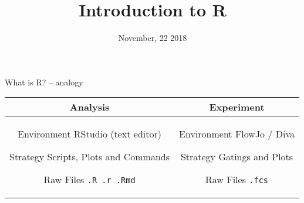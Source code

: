 \documentclass[10pt, xcolor=table]{beamer}
\title{%
  Introduction to R
}
\author{%
}
\date{November, 22 2018}
\institute{%
  \texttt{simon.tournier@univ-paris-diderot.fr}
}
\begin{document}
\begin{frame}
  \titlepage
\end{frame}


\begin{frame}{What is R? -- analogy}

  \begin{tabular}{c|c}
    Analysis & Experiment
    \\
    \hline
    \begin{minipage}{0.49\textwidth}
      \begin{block}{Environment}
        \centering
        RStudio (text editor)
      \end{block}
      \begin{exampleblock}{Strategy}
        \centering
        Scripts, Plots and Commands
      \end{exampleblock}

      \begin{alertblock}{Raw}
        \centering
        Files \texttt{.R .r .Rmd}
      \end{alertblock}
    \end{minipage}
    &
    \begin{minipage}{0.49\textwidth}
      \begin{block}{Environment}
        \centering
        FlowJo / Diva
      \end{block}
      \begin{exampleblock}{Strategy}
        \centering
        Gatings and Plots
      \end{exampleblock}
      \begin{alertblock}{Raw}
        \centering
        Files \texttt{.fcs}
      \end{alertblock}
    \end{minipage}
  \end{tabular}
\end{frame}
\end{document}
